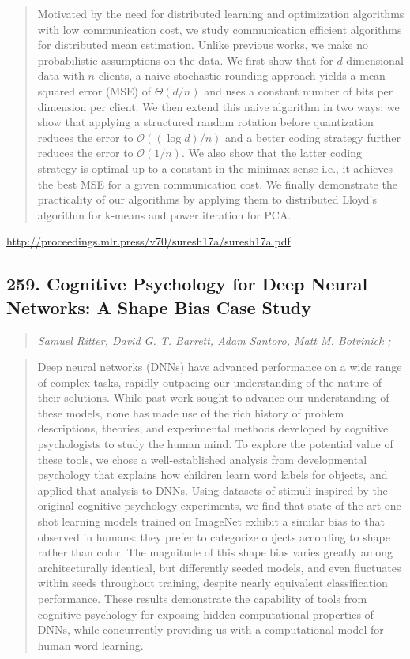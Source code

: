 \documentclass{article}
\begin{document}
\begin{quote}
    Motivated by the need for distributed learning and optimization algorithms with low communication cost, we study communication efficient algorithms for distributed mean estimation. Unlike previous works, we make no probabilistic assumptions on the data. We first show that for $d$ dimensional data with $n$ clients, a naive stochastic rounding approach yields a mean squared error (MSE) of $\Theta(d/n)$ and uses a constant number of bits per dimension per client. We then extend this naive algorithm in two ways: we show that applying a structured random rotation before quantization reduces the error to $\mathcal{O}((\log d)/n)$ and a better coding strategy further reduces the error to $\mathcal{O}(1/n)$. We also show that the latter coding strategy is optimal up to a constant in the minimax sense i.e., it achieves the best MSE for a given communication cost. We finally demonstrate the practicality of our algorithms by applying them to distributed Lloyd’s algorithm for k-means and power iteration for PCA.  \end{quote}

\href{http://proceedings.mlr.press/v70/suresh17a/suresh17a.pdf}{http://proceedings.mlr.press/v70/suresh17a/suresh17a.pdf}

\subsection{259. Cognitive Psychology for Deep Neural Networks: A Shape Bias Case Study}

\begin{quote}
\footnotesize{\textit{Samuel Ritter, David G. T. Barrett, Adam Santoro, Matt M. Botvinick ;}}
\end{quote}

\begin{quote}
    Deep neural networks (DNNs) have advanced performance on a wide range of complex tasks, rapidly outpacing our understanding of the nature of their solutions. While past work sought to advance our understanding of these models, none has made use of the rich history of problem descriptions, theories, and experimental methods developed by cognitive psychologists to study the human mind. To explore the potential value of these tools, we chose a well-established analysis from developmental psychology that explains how children learn word labels for objects, and applied that analysis to DNNs. Using datasets of stimuli inspired by the original cognitive psychology experiments, we find that state-of-the-art one shot learning models trained on ImageNet exhibit a similar bias to that observed in humans: they prefer to categorize objects according to shape rather than color. The magnitude of this shape bias varies greatly among architecturally identical, but differently seeded models, and even fluctuates within seeds throughout training, despite nearly equivalent classification performance. These results demonstrate the capability of tools from cognitive psychology for exposing hidden computational properties of DNNs, while concurrently providing us with a computational model for human word learning.  \end{quote}
\end{document}

